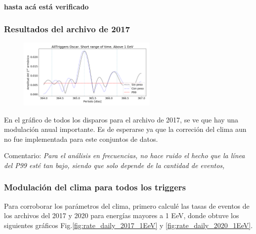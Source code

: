 {\bf hasta acá está verificado}
			\subsubsection{Resultados del archivo de 2017}

				\begin{figure}[H]
					\centering
					\includegraphics[width=0.6\textwidth]{../Anisotropia/AllTriggers/AllTriggers_2017_Short_range_Above_1_EeV.png}
				\end{figure}
			En el gráfico de todos los disparos para el archivo de 2017, se ve que hay una modulación anual importante. Es de esperarse ya que la correción del clima aun no fue implementada para este conjuntos de datos.

			Comentario: {\sl Para el análisis en frecuencias, no hace ruido el hecho que la línea del P99 esté tan bajo, siendo que solo depende de la cantidad de eventos, }





			\subsubsection{Modulación del clima para todos los triggers}




			Para corroborar los parámetros del clima, primero calculé las tasas de eventos de los archivos del 2017 y 2020 para energías mayores a 1  EeV, donde obtuve los siguientes gráficos Fig.\ref{fig:rate_daily_2017_1EeV} y \ref{fig:rate_daily_2020_1EeV}. 

